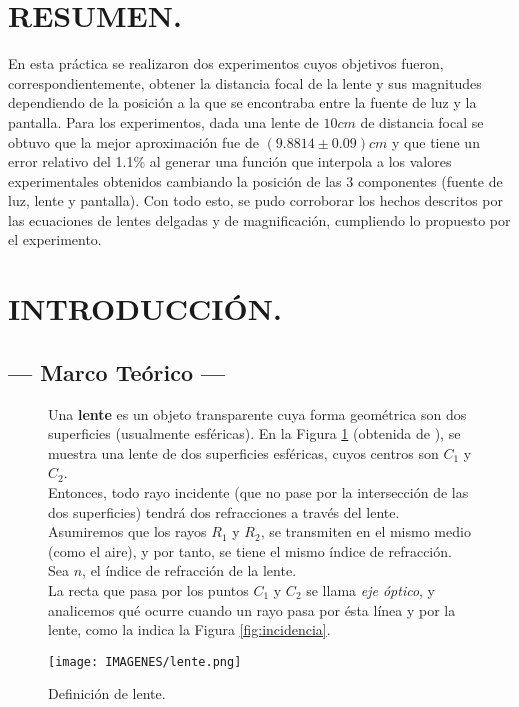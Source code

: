 \documentclass[10pt,a4paper]{article}
\begin{document}
\portada

\section{RESUMEN.} %
En esta práctica  se realizaron dos experimentos cuyos objetivos fueron, correspondientemente, obtener la distancia focal de la lente y sus magnitudes dependiendo de la posición a la que se encontraba entre la fuente de luz y la pantalla. Para los experimentos, dada una lente de $10cm$ de distancia focal se obtuvo que la mejor aproximación fue de $(9.8814 \pm 0.09)cm$ y que tiene un error relativo del 1.1\textsc{\%} al generar una función que interpola a los valores experimentales obtenidos cambiando la posición de las 3 componentes (fuente de luz, lente y pantalla). Con todo esto, se pudo corroborar los hechos descritos por las ecuaciones de lentes delgadas y de magnificación, cumpliendo lo propuesto por el experimento.

\section{INTRODUCCIÓN.} %

\subsection{--- Marco Teórico ---} %
\label{sub:marco_teorico}
\begin{figure}[ht]
	\begin{minipage}{0.55\linewidth}
		Una \textbf{lente} es un objeto transparente cuya forma geométrica son dos superficies (usualmente esféricas). En la Figura \ref{fig:definicion_lente} (obtenida de ), se muestra una lente de dos superficies esféricas, cuyos centros son \(C_1\) y \(C_2\). \\[2mm]
		Entonces, todo rayo incidente (que no pase por la intersección de las dos superficies) tendrá dos refracciones a través del lente. \\[2mm]
		Asumiremos que los rayos \(R_1\) y \(R_2\), se transmiten en el mismo medio (como el aire), y por tanto, se tiene el mismo índice de refracción. Sea \(n\), el índice de refracción de la lente. \\[2mm]
		La recta que pasa por los puntos \(C_1\) y \(C_2\) se llama \textit{eje óptico}, y analicemos qué ocurre cuando un rayo pasa por ésta línea y por la lente, como la indica la Figura \ref{fig:incidencia}.
	\end{minipage}\hspace{5mm}
	\begin{minipage}{0.45\linewidth}
		\centering
		\texttt{[image: IMAGENES/lente.png]}
		\caption{Definición de lente.}
		\label{fig:definicion_lente}
	\end{minipage}
\end{figure}
\end{document}

